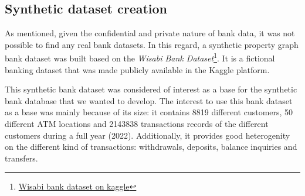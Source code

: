 \documentclass{article}
\begin{document}

\subsection{Synthetic dataset creation}

As mentioned, given the confidential and private nature of bank data, it was not possible to find
any real bank datasets. In this regard, a synthetic property
graph bank dataset was built based on the \emph{Wisabi Bank Dataset}\footnote{\href{https://www.kaggle.com/datasets/obinnaiheanachor/wisabi-bank-dataset}{Wisabi bank dataset on kaggle}}. It is a fictional banking dataset that was made publicly available in
the Kaggle platform.

This synthetic bank dataset was considered of interest as a base for the synthetic bank
database that we wanted to develop. The interest to use this bank dataset as a base was mainly because of its size: it contains 8819 different customers, 50 different ATM locations and 2143838 transactions records of the different customers during a full year (2022). Additionally, it provides good heterogenity on the different kind of transactions: withdrawals, deposits, balance inquiries and transfers.
\end{document}
